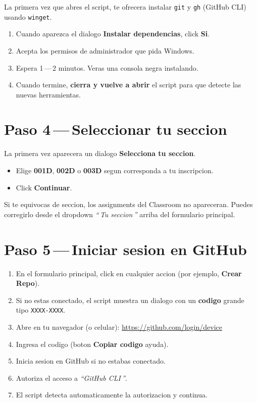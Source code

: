 \documentclass[11pt,a4paper,oneside]{report}
\begin{document}
La primera vez que abres el script, te ofrecera instalar \texttt{git} y \texttt{gh} (GitHub CLI) usando \texttt{winget}.

\begin{enumerate}
  \item Cuando aparezca el dialogo \textbf{Instalar dependencias}, click \textbf{Si}.
  \item Acepta los permisos de administrador que pida Windows.
  \item Espera 1\,---\,2 minutos. Veras una consola negra instalando.
  \item Cuando termine, \textbf{cierra y vuelve a abrir} el script para que detecte las nuevas herramientas.
\end{enumerate}

\section{Paso 4\,---\,Seleccionar tu seccion}

La primera vez aparecera un dialogo \textbf{Selecciona tu seccion}.

\begin{itemize}
  \item Elige \textbf{001D}, \textbf{002D} o \textbf{003D} segun corresponda a tu inscripcion.
  \item Click \textbf{Continuar}.
\end{itemize}

\begin{warnbox}[Importante]
Si te equivocas de seccion, los assignments del Classroom no apareceran. Puedes corregirlo desde el dropdown \emph{\textquotedblleft\,Tu seccion\,\textquotedblright} arriba del formulario principal.
\end{warnbox}

\section{Paso 5\,---\,Iniciar sesion en GitHub}

\begin{enumerate}
  \item En el formulario principal, click en cualquier accion (por ejemplo, \textbf{Crear Repo}).
  \item Si no estas conectado, el script muestra un dialogo con un \textbf{codigo} grande tipo \texttt{XXXX-XXXX}.
  \item Abre en tu navegador (o celular): \url{https://github.com/login/device}
  \item Ingresa el codigo (boton \textbf{Copiar codigo} ayuda).
  \item Inicia sesion en GitHub si no estabas conectado.
  \item Autoriza el acceso a \emph{\textquotedblleft GitHub CLI\,\textquotedblright}.
  \item El script detecta automaticamente la autorizacion y continua.
\end{enumerate}
\end{document}
